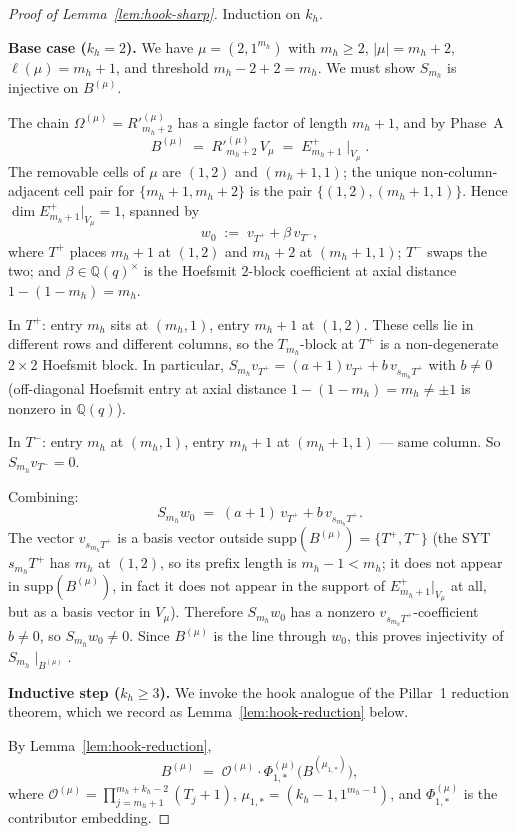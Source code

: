 \documentclass[11pt]{article}
\theoremstyle{definition}
\newcommand{\Om}{\Omega}
\newcommand{\supp}{\mathrm{supp}}
\newcommand{\Rp}{{R'}}
\newcommand{\Outer}{\mathcal{O}}
\begin{document}
\begin{proof}[Proof of Lemma~\ref{lem:hook-sharp}]
Induction on $k_h$.

\medskip\textbf{Base case ($k_h = 2$).}
We have $\mu = (2, 1^{m_h})$ with $m_h \ge 2$, $|\mu| = m_h + 2$,
$\ell(\mu) = m_h + 1$, and threshold $m_h - 2 + 2 = m_h$. We must show
$S_{m_h}$ is injective on $B^{(\mu)}$.

The chain $\Om^{(\mu)} = \Rp_{m_h+2}^{(\mu)}$ has a single factor of
length $m_h + 1$, and by Phase~A
\[
   B^{(\mu)} \;=\; \Rp_{m_h+2}^{(\mu)}\, V_\mu
   \;=\; E^+_{m_h+1}\!\mid_{V_\mu}.
\]
The removable cells of $\mu$ are $(1, 2)$ and $(m_h+1, 1)$; the unique
non-column-adjacent cell pair for $\{m_h+1, m_h+2\}$ is the pair
$\{(1, 2), (m_h+1, 1)\}$. Hence $\dim E^+_{m_h+1}|_{V_\mu} = 1$,
spanned by
\[
   w_0 \;:=\; v_{T^+} + \beta\, v_{T^-},
\]
where $T^+$ places $m_h+1$ at $(1, 2)$ and $m_h+2$ at $(m_h+1, 1)$;
$T^-$ swaps the two; and $\beta \in \mathbb{Q}(q)^\times$ is the
Hoefsmit $2$-block coefficient at axial distance $1 - (1 - m_h) =
m_h$.

In $T^+$: entry $m_h$ sits at $(m_h, 1)$, entry $m_h+1$ at $(1, 2)$.
These cells lie in different rows and different columns, so the
$T_{m_h}$-block at $T^+$ is a non-degenerate $2 \times 2$ Hoefsmit
block. In particular, $S_{m_h} v_{T^+} = (a+1) v_{T^+} + b\,
v_{s_{m_h} T^+}$ with $b \ne 0$ (off-diagonal Hoefsmit entry at axial
distance $1 - (1 - m_h) = m_h \ne \pm 1$ is nonzero in $\mathbb{Q}(q)$).

In $T^-$: entry $m_h$ at $(m_h, 1)$, entry $m_h+1$ at $(m_h+1, 1)$ —
same column. So $S_{m_h} v_{T^-} = 0$.

Combining:
\[
   S_{m_h} w_0
   \;=\; (a+1)\, v_{T^+} + b\, v_{s_{m_h} T^+}.
\]
The vector $v_{s_{m_h} T^+}$ is a basis vector outside $\supp(B^{(\mu)})
= \{T^+, T^-\}$ (the SYT $s_{m_h} T^+$ has $m_h$ at $(1, 2)$, so its
prefix length is $m_h - 1 < m_h$; it does not appear in $\supp(B^{(\mu)})$,
in fact it does not appear in the support of $E^+_{m_h+1}|_{V_\mu}$ at
all, but as a basis vector in $V_\mu$). Therefore $S_{m_h} w_0$ has a
nonzero $v_{s_{m_h} T^+}$-coefficient $b \ne 0$, so $S_{m_h} w_0
\ne 0$. Since $B^{(\mu)}$ is the line through $w_0$, this proves
injectivity of $S_{m_h}\!\mid_{B^{(\mu)}}$.

\medskip\textbf{Inductive step ($k_h \ge 3$).}
We invoke the hook analogue of the Pillar~1 reduction theorem,
which we record as Lemma~\ref{lem:hook-reduction} below.

By Lemma~\ref{lem:hook-reduction},
\[
   B^{(\mu)} \;=\; \Outer^{(\mu)} \cdot
   \Phi^{(\mu)}_{1,*}\bigl(B^{(\mu_{1,*})}\bigr),
\]
where $\Outer^{(\mu)} = \prod_{j=m_h+1}^{m_h+k_h-2}(T_j+1)$,
$\mu_{1,*} = (k_h-1, 1^{m_h-1})$, and $\Phi^{(\mu)}_{1,*}$ is the
contributor embedding.


\end{proof}
\end{document}
